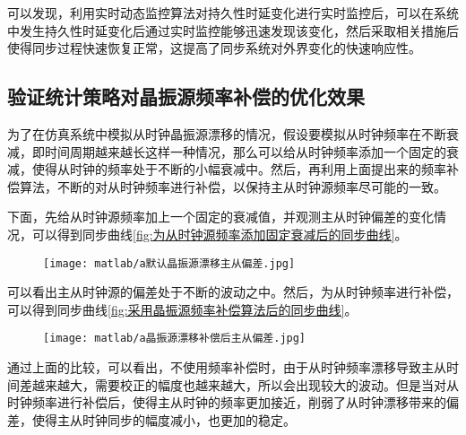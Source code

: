 可以发现，利用实时动态监控算法对持久性时延变化进行实时监控后，可以在系统中发生持久性时延变化后通过实时监控能够迅速发现该变化，然后采取相关措施后使得同步过程快速恢复正常，这提高了同步系统对外界变化的快速响应性。

\subsection{验证统计策略对晶振源频率补偿的优化效果}
为了在仿真系统中模拟从时钟晶振源漂移的情况，假设要模拟从时钟频率在不断衰减，即时间周期越来越长这样一种情况，那么可以给从时钟频率添加一个固定的衰减，使得从时钟的频率处于不断的小幅衰减中。然后，再利用上面提出来的频率补偿算法，不断的对从时钟频率进行补偿，以保持主从时钟源频率尽可能的一致。

下面，先给从时钟源频率加上一个固定的衰减值，并观测主从时钟偏差的变化情况，可以得到同步曲线\ref{fig:为从时钟源频率添加固定衰减后的同步曲线}。
\begin{figure}[!hbp]
  \centering
  \begin{minipage}[b]{1\textwidth}
    \captionstyle{\centering}
    \centering
    \texttt{[image: matlab/a默认晶振源漂移主从偏差.jpg]}
  \end{minipage}     
\end{figure}

可以看出主从时钟源的偏差处于不断的波动之中。然后，为从时钟频率进行补偿，可以得到同步曲线\ref{fig:采用晶振源频率补偿算法后的同步曲线}。
\begin{figure}[htbp]
  \centering
  \begin{minipage}[b]{1\textwidth}
    \captionstyle{\centering}
    \centering
    \texttt{[image: matlab/a晶振源漂移补偿后主从偏差.jpg]}
  \end{minipage}     
\end{figure}

通过上面的比较，可以看出，不使用频率补偿时，由于从时钟频率漂移导致主从时间差越来越大，需要校正的幅度也越来越大，所以会出现较大的波动。但是当对从时钟频率进行补偿后，使得主从时钟的频率更加接近，削弱了从时钟漂移带来的偏差，使得主从时钟同步的幅度减小，也更加的稳定。

